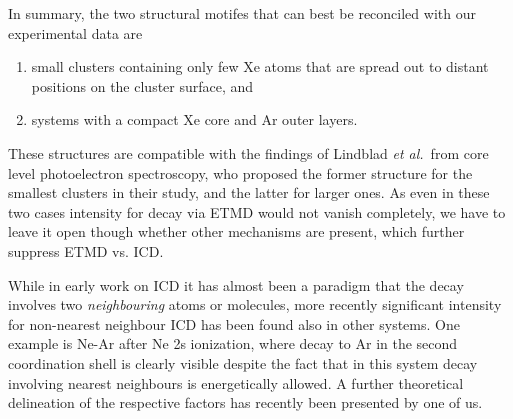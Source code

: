 In summary, the two structural motifes that can best be reconciled with our experimental data are
\begin{enumerate}
	\item small clusters containing only few Xe atoms that are spread out to distant positions on the cluster surface, and
	\item systems with a compact Xe core and Ar outer layers.
\end{enumerate}
These structures are compatible with the findings of Lindblad {\it et al.}\ from core level photoelectron spectroscopy, who proposed the former structure for the smallest clusters in their study, and the latter for larger ones.\cite{lindblad}
As even in these two cases intensity for decay via ETMD would not vanish completely, we have to leave it open though whether other mechanisms are present, which further suppress ETMD vs. ICD.

While in early work on ICD it has almost been a paradigm that the decay involves two {\it neighbouring} atoms or molecules,\cite{hergenhahn_review} more recently significant intensity for non-nearest neighbour ICD has been found also in other systems.
One example is Ne-Ar after Ne 2s ionization, where decay to Ar in the second coordination shell is clearly visible despite the fact that in this system decay involving nearest neighbours is energetically allowed.\cite{fasshauer2014}
A further theoretical delineation of the respective factors has recently been presented by one of us.\cite{fasshauernjp}
